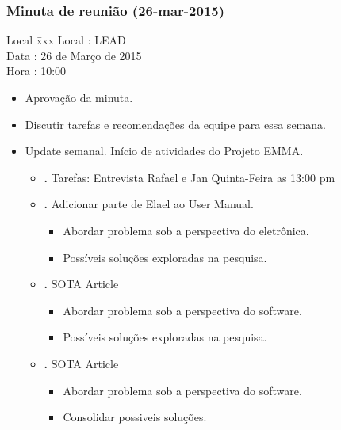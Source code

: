 \subsubsection{Minuta de reunião (26-mar-2015)}

\begin{tabbing}
  Local \= xxx \kill
  Local \> : LEAD \\
  Data  \> : 26 de Março de 2015 \\
  Hora  \> : 10:00
\end{tabbing}


\begin{itemize}
  \item Aprovação da minuta.

  \item Discutir tarefas e recomendações da equipe para essa semana.


  \item Update semanal. Início de atividades do Projeto EMMA.
  \begin{itemize}

    \item \textbf{\alana.} Tarefas: Entrevista Rafael e Jan Quinta-Feira as 13:00 pm 
    
    \item \textbf{\renan.} Adicionar parte de Elael ao User Manual.
    	\begin{itemize}    
			 \item Abordar problema sob a perspectiva do eletrônica.
			 \item Possíveis soluções exploradas na pesquisa. 
    		\end{itemize}
    
    \item \textbf{\elael.} SOTA Article
    		\begin{itemize}    
			 \item Abordar problema sob a perspectiva do software.
			 \item Possíveis soluções exploradas na pesquisa. 
    		\end{itemize}
    		
    \item \textbf{\gabriel.} SOTA Article
    		\begin{itemize}    
			 \item Abordar problema sob a perspectiva do software.
			 \item Consolidar possiveis soluções. 
			\end{itemize}
  \end{itemize}
  

\end{itemize}
